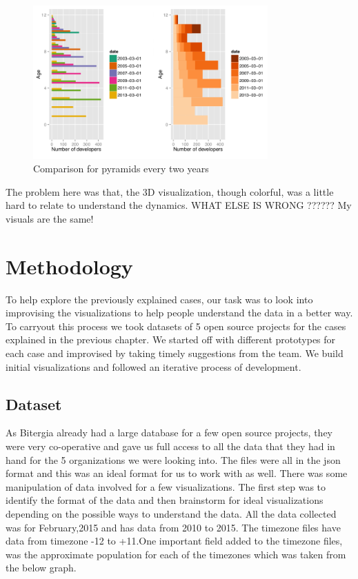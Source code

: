 \documentclass[double,12pt]{beavtex}
\begin{document}
\begin{figure}[!ht]
\centering
\includegraphics[width=90mm]{age1.png}
\caption{Comparison for pyramids every two years}
\end{figure}

The problem here was that, the 3D visualization, though colorful, was a little hard to relate to understand the dynamics. WHAT ELSE IS WRONG ?????? My visuals are the same!


\chapter{Methodology}
To help explore the previously explained cases, our task was to look into improvising the visualizations to help people understand the data in a better way. To carryout this process we took datasets of 5 open source projects for the cases explained in the previous chapter. We started off with different prototypes for each case and improvised by taking timely suggestions from the team. We build initial visualizations and followed an iterative process of development.  

\section{Dataset}
As Bitergia already had a large database for a few open source projects, they were very co-operative and gave us full access to all the data that they had in hand for the 5 organizations we were looking into. The files were all in the json format and this was an ideal format for us to work with as well. There was some manipulation of data involved for a few visualizations. The first step was to identify the format of the data and then brainstorm for ideal visualizations depending on the possible ways to understand the data. All the data collected was for February,2015 and has data from 2010 to 2015. The timezone files have data from timezone -12 to +11.One important field added to the timezone files, was the approximate population for each of the timezones which was taken from the below graph.
\end{document}
